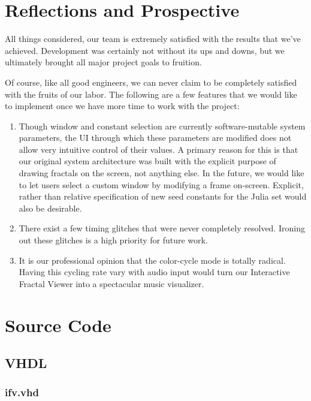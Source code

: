 \documentclass{article}
\begin{document}
\section{Reflections and Prospective}

All things considered, our team is extremely satisfied with the results that we've achieved. 
Development was certainly not without its ups and downs, but we ultimately brought all major project
goals to fruition. 

Of course, like all good engineers, we can never claim to be completely satisfied with the fruits of our
labor. The following are a few features that we would like to implement once we have more time 
to work with the project:

\begin{enumerate}
\item Though window and constant selection are currently software-mutable system parameters, the UI through
which these parameters are modified does not allow very intuitive control of their values. A primary reason
for this is that our original system architecture was built with the explicit purpose of drawing fractals on the
screen, not anything else. In the future, we would like to let users select a custom window by modifying a frame 
on-screen. Explicit, rather than relative specification of new seed constants for the Julia set would also be 
desirable.
\item There exist a few timing glitches that were never completely resolved. Ironing out these glitches is a high
priority for future work.
\item It is our professional opinion that the color-cycle mode is totally radical. Having this cycling rate vary 
with audio input would turn our Interactive Fractal Viewer into a spectacular music visualizer.
\end{enumerate}

\appendix
\section{Source Code}
\subsection{VHDL}
\subsubsection{ifv.vhd}							%
\end{document}
